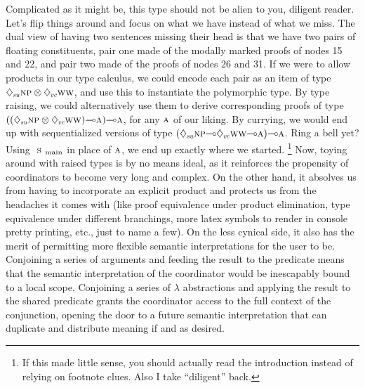 Complicated as it might be, this type should not be alien to you, diligent reader.
Let's flip things around and focus on what we have instead of what we miss.
The dual view of having two sentences missing their head is that we have two pairs of floating constituents, pair one made of the modally marked proofs of nodes 15 and 22, and pair two made of the proofs of nodes 26 and 31.
If we were to allow products in our type calculus, we could encode each pair as an item of type $\ddia{su}\np[s]\otimes\ddia{vc}\ww$, and use this to instantiate the polymorphic type.
By type raising, we could alternatively use them to derive corresponding proofs of type $((\ddia{su}\np[s]\otimes\ddia{vc}\ww)\li\smallgtype{a})\li\smallgtype{a}$, for any $\textsc{\normalfont\textsc{a}}$ of our liking.
By currying, we would end up with sequentialized versions of type $(\ddia{su}\np[s]\li\ddia{vc}\ww\li\smallgtype{a})\li\smallgtype{a}$.
Ring a bell yet?
Using $\smain[s]$ in place of $\textsc{\normalfont\textsc{a}}$, we end up exactly where we started.%
	\footnote{If this made little sense, you should actually read the introduction instead of relying on footnote clues.
	Also I take ``diligent'' back.}
Now, toying around with raised types is by no means ideal, as it reinforces the propensity of coordinators to become very long and complex.
On the other hand, it absolves us from having to incorporate an explicit product and protects us from the headaches it comes with (like proof equivalence under product elimination, type equivalence under different branchings, more latex symbols to render in console pretty printing, etc., just to name a few).
On the less cynical side, it also has the merit of permitting more flexible semantic interpretations for the user to be.
Conjoining a series of arguments and feeding the result to the predicate means that the semantic interpretation of the coordinator would be inescapably bound to a local scope.
Conjoining a series of $\lambda$ abstractions and applying the result to the shared predicate grants the coordinator access to the full context of the conjunction, opening the door to a future semantic interpretation that can duplicate and distribute meaning if and as desired.

